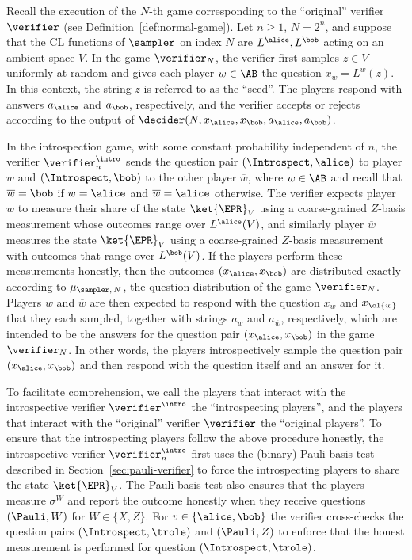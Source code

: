 Recall the execution of the $N$-th game corresponding to the ``original''
verifier $\verifier$ (see Definition~\ref{def:normal-game}).
Let $n\geq 1$, $N=2^n$, and suppose that the CL functions of $\sampler$ on index
$N$ are $L^\alice,L^\bob$ acting on an ambient space $V$.
In the game $\verifier_N$, the verifier first samples $z \in V$ uniformly at
random and gives each player $w\in\AB$ the question $x_w = L^w(z)$.
In this context, the string $z$ is referred to as the ``seed''.
The players respond with answers $a_\alice$ and $a_\bob$, respectively, and the
verifier accepts or rejects according to the output of $\decider(N, x_\alice,
x_\bob, a_\alice, a_\bob)$.

In the introspection game, with some constant probability independent of $n$,
the verifier $\verifier^\intro_n$ sends the question pair $(\Introspect,\alice)$
to player $w$ and $(\Introspect,\bob)$ to the other player $\overline{w}$, where
$w \in \AB$ and recall that $\overline{w}=\bob$ if $w=\alice$ and
$\overline{w}=\alice$ otherwise.
The verifier expects player $w$ to measure their share of the state
$\ket{\EPR}_V$ using a coarse-grained $Z$-basis measurement whose outcomes range
over $L^\alice(V)$, and similarly player $\overline{w}$ measures the state
$\ket{\EPR}_V$ using a coarse-grained $Z$-basis measurement with outcomes that
range over $L^\bob(V)$.
If the players perform these measurements honestly, then the outcomes
$(x_\alice,x_\bob)$ are distributed exactly according to $\mu_{\sampler,\, N}$, the
question distribution of the game $\verifier_N$.
Players $w$ and $\overline{w}$ are then expected to respond with the question
$x_w$ and $x_{\ol{w}}$ that they each sampled, together with strings $a_w$ and
$a_{\overline{w}}$, respectively, which are intended to be the answers for the
question pair $(x_\alice,x_\bob)$ in the game $\verifier_N$.
In other words, the players introspectively sample the question pair
$(x_\alice,x_\bob)$ and then respond with the question itself and an answer for
it.

To facilitate comprehension, we call the players that interact with the
introspective verifier $\verifier^\intro$ the ``introspecting players'', and the
players that interact with the ``original'' verifier $\verifier$ the ``original
players''.
To ensure that the introspecting players follow the above procedure honestly,
the introspective verifier $\verifier^\intro_n$ first uses the (binary) Pauli
basis test described in Section~\ref{sec:pauli-verifier} to force the
introspecting players to share the state $\ket{\EPR}_{V}$.
The Pauli basis test also ensures that the players measure $\sigma^W$ and report
the outcome honestly when they receive questions $(\Pauli, W)$ for $W \in \{X,
Z\}$.
For $v\in\{\alice,\bob\}$ the verifier cross-checks the question pairs
$(\Introspect, \trole)$ and $(\Pauli, Z)$ to enforce that the honest measurement
is performed for question $(\Introspect, \trole)$.

